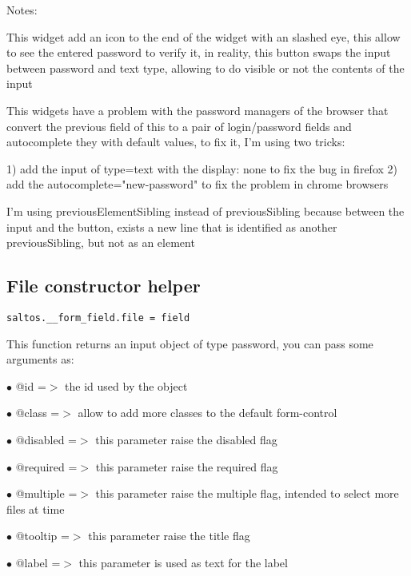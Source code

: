 \documentclass[a4paper]{book}
\begin{document}
Notes:

This widget add an icon to the end of the widget with an slashed eye, this allow to
see the entered password to verify it, in reality, this button swaps the input between
password and text type, allowing to do visible or not the contents of the input

This widgets have a problem with the password managers of the browser that convert the
previous field of this to a pair of login/password fields and autocomplete they with
default values, to fix it, I'm using two tricks:

1) add the input of type=text with the display: none to fix the bug in firefox
2) add the autocomplete="new-password" to fix the problem in chrome browsers

I'm using previousElementSibling instead of previousSibling because between the input and the
button, exists a new line that is identified as another previousSibling, but not as an element

\hypertarget{toc392}{}
\subsection{File constructor helper}

\begin{lstlisting}
saltos.__form_field.file = field
\end{lstlisting}

This function returns an input object of type password, you can pass some arguments as:

\begin{compactitem}
\item[\color{myblue}$\bullet$] @id       =$>$ the id used by the object
\item[\color{myblue}$\bullet$] @class    =$>$ allow to add more classes to the default form-control
\item[\color{myblue}$\bullet$] @disabled =$>$ this parameter raise the disabled flag
\item[\color{myblue}$\bullet$] @required =$>$ this parameter raise the required flag
\item[\color{myblue}$\bullet$] @multiple =$>$ this parameter raise the multiple flag, intended to select more files at time
\item[\color{myblue}$\bullet$] @tooltip  =$>$ this parameter raise the title flag
\item[\color{myblue}$\bullet$] @label    =$>$ this parameter is used as text for the label
\end{compactitem}
\end{document}
